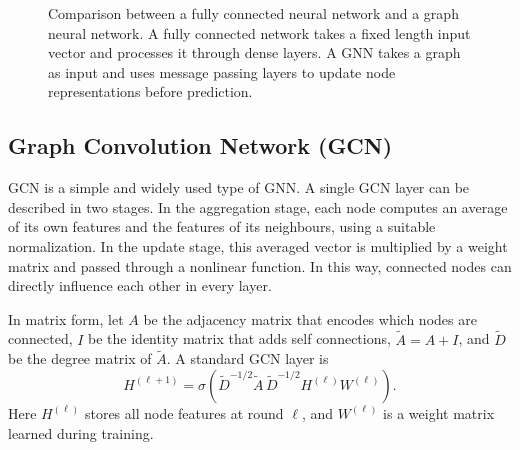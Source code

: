 \begin{figure}[H]
    \caption{Comparison between a fully connected neural network and a graph neural network. A fully connected network takes a fixed length input vector and processes it through dense layers. A GNN takes a graph as input and uses message passing layers to update node representations before prediction.}
    \label{fig:nn_gnn_comparison}
\end{figure}

\subsection{Graph Convolution Network (GCN)}
GCN is a simple and widely used type of GNN.
A single GCN layer can be described in two stages.
In the aggregation stage, each node computes an average of its own features and the features of its neighbours, using a suitable normalization.
In the update stage, this averaged vector is multiplied by a weight matrix and passed through a nonlinear function.
In this way, connected nodes can directly influence each other in every layer.

\noindent In matrix form, let $A$ be the adjacency matrix that encodes which nodes are connected, $I$ be the identity matrix that adds self connections, $\tilde{A}=A+I$, and $\tilde{D}$ be the degree matrix of $\tilde{A}$. A standard GCN layer is
\begin{equation}
H^{(\ell+1)} = \sigma\!\left(\tilde{D}^{-1/2} \tilde{A}\, \tilde{D}^{-1/2} H^{(\ell)} W^{(\ell)}\right).
\end{equation}
Here $H^{(\ell)}$ stores all node features at round $\ell$, and $W^{(\ell)}$ is a weight matrix learned during training.

